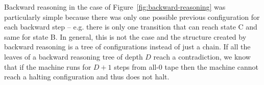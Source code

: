 Backward reasoning in the case of Figure~\ref{fig:backward-reasoning} was particularly simple because there was only one possible previous configuration for each backward step -- e.g. there is only one transition that can reach state \textcolor{colorC}{C} and same for state \textcolor{colorB}{B}. In general, this is not the case and the structure created by backward reasoning is a tree of configurations instead of just a chain. If all the leaves of a backward reasoning tree of depth $D$ reach a contradiction, we know that if the machine runs for $D+1$ steps from all-0 tape then the machine cannot reach a halting configuration and thus does not halt.